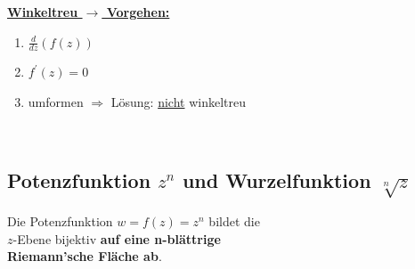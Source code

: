 		\begin{minipage}[]{0.35\textwidth}
			\underline{\textbf{Winkeltreu $\rightarrow$ Vorgehen:}}
			\begin{enumerate}
				\item $\frac{d}{dz} (f(z))$
				\item $f^{\prime}\left( z \right) = 0$
				\item umformen $\Rightarrow$ Lösung: \underline{nicht} winkeltreu
			\end{enumerate}
		\end{minipage}\\[3pt]
	
	\subsection{Potenzfunktion $z^n$ und Wurzelfunktion $\sqrt[n]{z}$}
		\begin{minipage}[]{0.5\textwidth}
			\begin{framed}
				Die Potenzfunktion $w = f\left( z \right) = z^n$ bildet die\\[3pt]
				$z$-Ebene bijektiv \textbf{auf eine n-blättrige\\[3pt] Riemann'sche Fläche ab}.
			\end{framed}
		\end{minipage}
		\begin{minipage}[]{0.5\textwidth}
		\end{minipage}\\[3pt]
	
